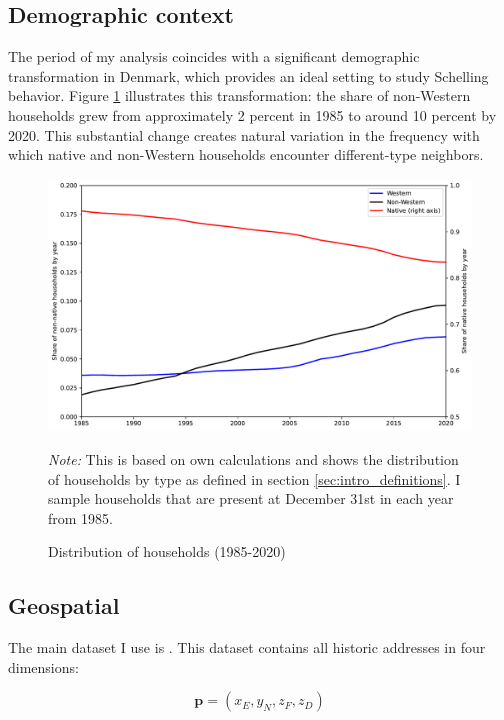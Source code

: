 \documentclass[main.tex]{subfiles}
\begin{document}
\subsection{Demographic context}
The period of my analysis coincides with a significant demographic transformation in Denmark, which provides an ideal setting to study Schelling behavior. Figure \ref{fig:hh_dist_1985_2020} illustrates this transformation: the share of non-Western households grew from approximately 2 percent in 1985 to around 10 percent by 2020. This substantial change creates natural variation in the frequency with which native and non-Western households encounter different-type neighbors.
\begin{figure}[H]
    \centering
    \caption{Distribution of households (1985-2020)}
    \includegraphics[width=\linewidth]{figs/hh_dist_1985_2020.pdf}
    \label{fig:hh_dist_1985_2020}
\begin{tablenotes}
\item \footnotesize \textit{Note:} This is based on own calculations and shows the distribution of households by type as defined in section \ref{sec:intro_definitions}. I sample households that are present at December 31st in each year from 1985.
\end{tablenotes}
\end{figure}

\subsection{Geospatial}
\label{sec:data_geospatial}
The main dataset I use is . This dataset contains all historic addresses in four dimensions:

\begin{equation}
    \mathbf{p} = (x_E, y_N, z_F, z_D)
\end{equation}
\end{document}
